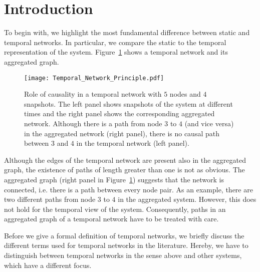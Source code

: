 \section{Introduction}\label{sec:temporal_networks_basics}
To begin with, we highlight the most fundamental difference between static and temporal networks.
In particular, we compare the static to the temporal representation of the system.
Figure~\ref{fig:temporal_network_principle} shows a temporal network and its aggregated graph.
%
\begin{figure}[htb]
\begin{center}
\texttt{[image: Temporal\_Network\_Principle.pdf]}
\caption{%
Role of causality in a temporal network with $5$ nodes and $4$ snapshots.
The left panel shows snapshots of the system at different times and the right panel shows the corresponding aggregated network.
Although there is a path from node $3$ to $4$ (and vice versa) in the aggregated network (right panel), there is no causal path between $3$ and $4$ in the temporal network (left panel).
}
\label{fig:temporal_network_principle}
\end{center}
\end{figure}
%
Although the edges of the temporal network are present also in the aggregated graph, the existence of paths of length greater than one is not as obvious.
The aggregated graph (right panel in Figure~\ref{fig:temporal_network_principle}) suggests that the network is connected, i.e. there is a path between every node pair.
As an example, there are two different paths from node $3$ to $4$ in the aggregated system.
However, this does not hold for the temporal view of the system.
Consequently, paths in an aggregated graph of a temporal network have to be treated with care.

Before we give a formal definition of temporal networks, we briefly discuss the different terms used for temporal networks in the literature.
Hereby, we have to distinguish between temporal networks in the sense above and other systems, which have a different focus.

